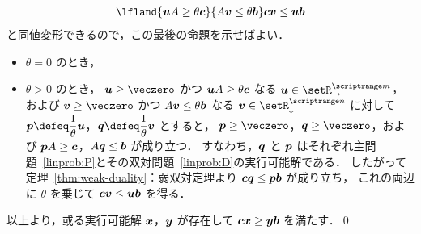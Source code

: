 \documentclass[a4paper]{jsarticle}
\begin{document}
{\begin{align*}
{{{{{            }{
              \lfland{\vecu A \geq \theta \vecc}{A \vecv \leq \theta \vecb}
            }
          }{
            \vecc \vecv \leq \vecu \vecb
          }
        }}}
      \end{align*}
      と同値変形できるので，この最後の命題を示せばよい．
      \begin{itemize}
      \item $\theta = 0$ のとき，\QUESTION
      \item $\theta > 0$ のとき，
        $\vecu \geq \veczero$ かつ $\bm{u} A \geq \theta \bm{c}$ なる $\vecu \in \setrowvec{\setR}{m}$，および
        $\vecv \geq \veczero$ かつ $A \bm{v} \leq \theta \bm{b}$ なる $\vecv \in \setcolvec{\setR}{n}$ に対して
        $\DS \vecp \defeq \frac{1}{\theta} \vecu$，$\DS \vecq \defeq \frac{1}{\theta} \vecv$ とすると，
        $\vecp \geq \veczero$，$\vecq \geq \veczero$，および $\bm{p} A \geq \bm{c}$，$A \bm{q} \leq \bm{b}$ が成り立つ．
        すなわち，$\bm{q}$ と $\bm{p}$ はそれぞれ主問題~\eqref{linprob:P}とその双対問題~\eqref{linprob:D}の実行可能解である．
        したがって定理~\ref{thm:weak-duality}：弱双対定理より $\bm{c} \bm{q} \leq \bm{p} \bm{b}$ が成り立ち，
        これの両辺に $\theta$ を乗じて $\bm{c} \bm{v} \leq \bm{u} \bm{b}$ を得る．
      \end{itemize}
      以上より，或る実行可能解 $\bm{x}$，$\bm{y}$ が存在して $\bm{c} \bm{x} \geq \bm{y} \bm{b}$ を満たす．\qed
    }
\end{document}
